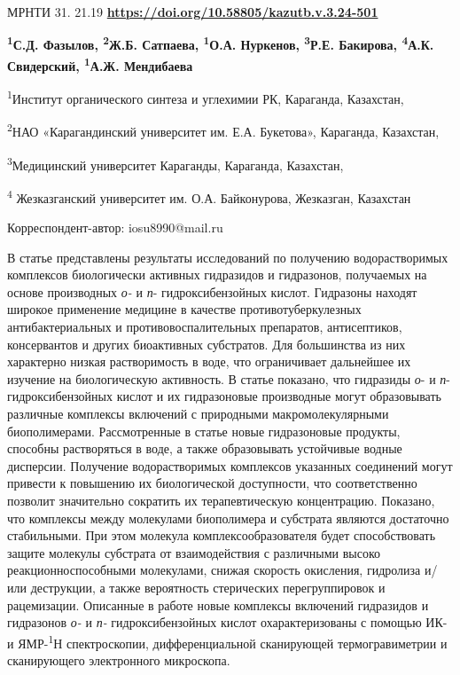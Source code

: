 \newpage
МРНТИ 31. 21.19
\hfill {\bfseries \href{https://doi.org/10.58805/kazutb.v.3.24-501}{https://doi.org/10.58805/kazutb.v.3.24-501}}


\begin{center}
{\bfseries \textsuperscript{1}С.Д. Фазылов, \textsuperscript{2}Ж.Б. Сатпаева, \textsuperscript{1}О.А. Нуркенов, \textsuperscript{3}Р.Е. Бакирова, \textsuperscript{4}А.К. Свидерский, \textsuperscript{1}А.Ж. Мендибаева}

\textsuperscript{1}Институт органического синтеза и углехимии РК,
Караганда, Казахстан,

\textsuperscript{2}НАО «Карагандинский университет им. Е.А. Букетова»,
Караганда, Казахстан,

\textsuperscript{3}Медицинский университет Караганды, Караганда,
Казахстан,

\textsuperscript{4} Жезказганский университет им. О.А. Байконурова,
Жезказган, Казахстан

Корреспондент-автор: iosu8990@mail.ru
\end{center}

В статье представлены результаты исследований по получению
водорастворимых комплексов биологически активных гидразидов и
гидразонов, получаемых на основе производных \emph{о-} и
\emph{п}- гидроксибензойных кислот. Гидразоны находят широкое применение
медицине в качестве противотуберкулезных антибактериальных и
противовоспалительных препаратов, антисептиков, консервантов и других
биоактивных субстратов. Для большинства из них характерно низкая
растворимость в воде, что ограничивает дальнейшее их изучение на
биологическую активность. В статье показано, что гидразиды \emph{о}- и
\emph{п}- гидроксибензойных кислот и их гидразоновые производные могут
образовывать различные комплексы включений с природными
макромолекулярными биополимерами. Рассмотренные в статье новые
гидразоновые продукты, способны растворяться в воде, а также
образовывать устойчивые водные дисперсии. Получение водорастворимых
комплексов указанных соединений могут привести к повышению их
биологической доступности, что соответственно позволит значительно
сократить их терапевтическую концентрацию. Показано, что комплексы между
молекулами биополимера и субстрата являются достаточно стабильными. При
этом молекула комплексообразователя будет способствовать защите молекулы
субстрата от взаимодействия с различными высоко реакционноспособными
молекулами, снижая скорость окисления, гидролиза и/или деструкции, а
также вероятность стерических перегруппировок и рацемизации. Описанные в
работе новые комплексы включений гидразидов и гидразонов \emph{о-} и
\emph{п- }гидроксибензойных кислот охарактеризованы с помощью ИК- и
ЯМР-\textsuperscript{1}Н спектроскопии, дифференциальной сканирующей
термогравиметрии и сканирующего электронного микроскопа.

